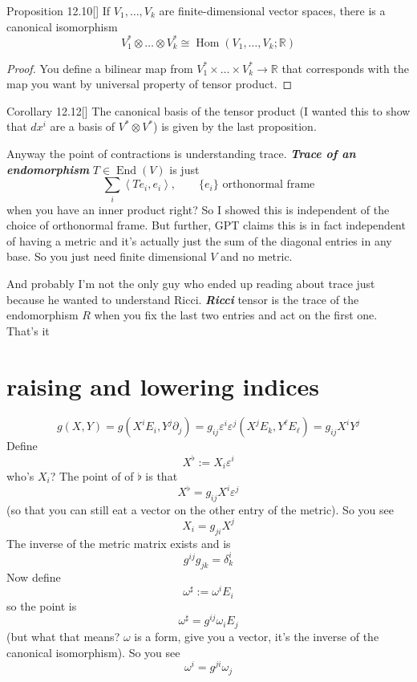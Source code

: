 \begin{thing4}{Proposition 12.10}[\cite{les}]\label{prop:12.10}\leavevmode
If  \(V_1,\ldots,V_k\) are finite-dimensional vector spaces, there is a canonical isomorphism
\[V_1^*  \otimes\ldots \otimes V^*_k \cong \operatorname{Hom}(V_1,\ldots,V_k;\mathbb{R})\]
\end{thing4}
\begin{proof}\leavevmode
You define a bilinear map from \(V^*_1 \times \ldots \times V^*_k \to \mathbb{R}\) that corresponds with the map you want by universal property of tensor product.
\end{proof}

\begin{thing6}{Corollary 12.12}[\cite{les}]\leavevmode
The canonical basis of the tensor product (I wanted this to show that \(dx^i\) are a basis of \(V^* \otimes V^*\)) is given by the last proposition.
\end{thing6}

Anyway the point of contractions is understanding trace. \textit{\textbf{Trace of an endomorphism}} \(T \in \operatorname{End}(V)\) is just
\[\sum_i \left<Te_i,e_i\right>,\qquad \{e_i\}\text{ orthonormal frame} \]
when you have an inner product right? So I showed this is independent of the choice of orthonormal frame. But further, GPT claims this is in fact independent of having a metric and it's actually just the sum of the diagonal entries in any base. So you just need finite dimensional \(V\) and no metric.

And probably I'm not the only guy who ended up reading about trace just because he wanted to understand Ricci. \textit{\textbf{Ricci}} tensor is the trace of the endomorphism  \(R\) when you fix the last two entries and act on the first one. That's it

\section{raising and lowering indices}

\[g(X,Y)=g(X^iE_i,Y^j\partial_j)=g_{ij}\varepsilon^i\varepsilon^j(X^jE_k,Y^\ell E_\ell)=g_{ij}X^iY^j\]
Define
\[X^\flat:=X_i\varepsilon^i\]
who's \(X_i\)? The point of of \(\flat\) is that
\[X^\flat =g_{ij}X^i\varepsilon^j\]
(so that you can still eat a vector on the other entry of the metric). So you see
\[X_i=g_{ji}X^j\]
The inverse of the metric matrix exists and is
\[g^{ij}g_{j k}=\delta^i_k\]
Now define
\[\omega^\sharp:=\omega^iE_i\]
so the point is
\[\omega^\sharp=g^{ij}\omega_iE_j\]
(but what that means? \(\omega\) is a form, give you a vector, it's the inverse of the canonical isomorphism). So you see
\[\omega^i=g^{ji}\omega_j\]



